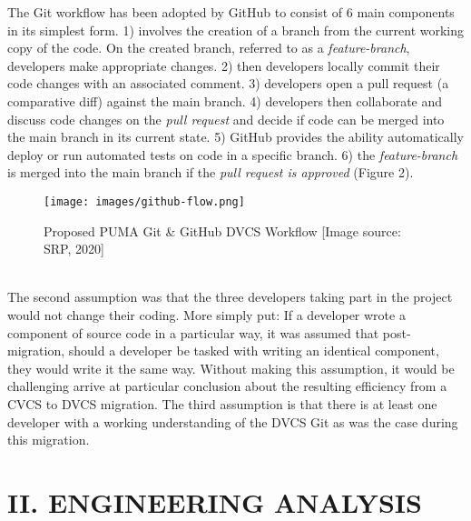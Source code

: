 \documentclass{article}
\begin{document}
{The Git workflow has been adopted by GitHub to consist of 6 main components in its simplest form.  \cite{understanding-git-workflow} 1) involves the creation of a branch from the current working copy of the code. On the created branch, referred to as a \textit{feature-branch}, developers make appropriate changes. 2) then developers locally commit their code changes with an associated comment. 3) developers open a pull request (a comparative diff) against the main branch. 4) developers then collaborate and discuss code changes on the \textit{pull request} and decide if code can be merged into the main branch in its current state. 5) GitHub provides the ability automatically deploy or run automated tests on code in a specific branch. 6) the \textit{feature-branch} is merged into the main branch if the \textit{pull request is approved} (Figure 2). 
\begin{figure}[h]
\centering
\texttt{[image: images/github-flow.png]}
\caption{Proposed PUMA Git \& GitHub DVCS Workflow [Image source: SRP, 2020]}
\end{figure}
\\
\indent
The second assumption was that the three developers taking part in the project would not change their coding. More simply put: If a developer wrote a component of source code in a particular way, it was assumed that post-migration, should a developer be tasked with writing an identical component, they would write it the same way. Without making this assumption, it would be challenging arrive at particular conclusion about the resulting efficiency from a CVCS to DVCS migration.  The third assumption is that there is at least one developer with a working understanding of the DVCS Git as was the case during this migration.
}
\newpage
\centering
\section*{II. ENGINEERING ANALYSIS}
\justify
\end{document}
